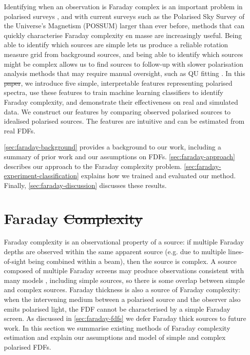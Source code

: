 \documentclass[11pt, a4paper]{book}
\providecommand{\DIFaddtex}[1]{{\protect\color{blue}\uwave{#1}}} %
\providecommand{\DIFdeltex}[1]{{\protect\color{red}\sout{#1}}}                      %
\providecommand{\DIFaddbegin}{} %
\providecommand{\DIFaddend}{} %
\providecommand{\DIFdelbegin}{} %
\providecommand{\DIFdelend}{} %
\providecommand{\DIFadd}[1]{\texorpdfstring{\DIFaddtex{#1}}{#1}} %
\providecommand{\DIFdel}[1]{\texorpdfstring{\DIFdeltex{#1}}{}} %
\newcommand{\DIFscaledelfig}{0.5}
\newlength{\DIFdelgraphicswidth} %
\newlength{\DIFdelgraphicsheight} %
\newcommand{\DIFaddincludegraphics}[2][]{{\color{blue}\fbox{\DIFOincludegraphics[#1]{#2}}}} %
\newcommand{\DIFdelincludegraphics}[2][]{%
\sbox{\DIFdelgraphicsbox}{\DIFOincludegraphics[#1]{#2}}%
\settoboxwidth{\DIFdelgraphicswidth}{\DIFdelgraphicsbox} %
\settoboxtotalheight{\DIFdelgraphicsheight}{\DIFdelgraphicsbox} %
\scalebox{\DIFscaledelfig}{%
\parbox[b]{\DIFdelgraphicswidth}{\usebox{\DIFdelgraphicsbox}\\[-\baselineskip] \rule{\DIFdelgraphicswidth}{0em}}\llap{\resizebox{\DIFdelgraphicswidth}{\DIFdelgraphicsheight}{%
\setlength{\unitlength}{\DIFdelgraphicswidth}%
\begin{picture}(1,1)%
\thicklines\linethickness{2pt} %
{\color[rgb]{1,0,0}\put(0,0){\framebox(1,1){}}}%
{\color[rgb]{1,0,0}\put(0,0){\line( 1,1){1}}}%
{\color[rgb]{1,0,0}\put(0,1){\line(1,-1){1}}}%
\end{picture}%
}\hspace*{3pt}}} %
} %
\DeclareRobustCommand{\DIFaddbegin}{\DIFOaddbegin \let\includegraphics\DIFaddincludegraphics} %
\DeclareRobustCommand{\DIFaddend}{\DIFOaddend \let\includegraphics\DIFOincludegraphics} %
\DeclareRobustCommand{\DIFdelbegin}{\DIFOdelbegin \let\includegraphics\DIFdelincludegraphics} %
\DeclareRobustCommand{\DIFdelend}{\DIFOaddend \let\includegraphics\DIFOincludegraphics} %
\begin{document}
  Identifying when an observation is Faraday complex is an important problem in polarised surveys \citep{sun15comparison}, and with current surveys such as the Polarised Sky Survey of the Universe's Magnetism (POSSUM) larger than ever before, methods that can quickly characterise Faraday complexity en masse are increasingly useful. Being able to identify which sources are simple lets us produce a reliable rotation measure grid from background sources, and being able to identify which sources might be complex allows us to find sources to follow-up with slower polarisation analysis methods that may require manual oversight, such as QU fitting \citep[as seen in e.g.][]{miyashita19qu,osullivan_broad-band_2017}. In this \DIFdelbegin \DIFdel{paper}\DIFdelend \DIFaddbegin \DIFadd{chapter}\DIFaddend , we introduce five simple, interpretable features representing polarised spectra, use these features to train machine learning classifiers to identify Faraday complexity, and demonstrate their effectiveness on real and simulated data. We construct our features by comparing observed polarised sources to idealised polarised sources. The features are intuitive and can be estimated from real FDFs.

  \autoref{sec:faraday-background} provides a background to our work, including a summary of prior work and our assumptions on FDFs. \autoref{sec:faraday-approach} describes our approach to the Faraday complexity problem. \autoref{sec:faraday-experiment-classification} explains how we trained and evaluated our method. Finally, \autoref{sec:faraday-discussion} discusses these results.

\section{Faraday \DIFdelbegin \DIFdel{Complexity}\DIFdelend \DIFaddbegin \DIFadd{complexity}\DIFaddend }
\label{sec:faraday-background}

    Faraday complexity is an observational property of a source: if multiple Faraday depths are observed within the same apparent source (e.g. due to multiple lines-of-sight being combined within a beam), then the source is complex. A source composed of multiple Faraday screens may produce observations consistent with many models \citep{sun15comparison}, including simple sources, so there is some overlap between simple and complex sources. Faraday thickness is also a source of Faraday complexity: when the intervening medium between a polarised source and the observer also emits polarised light, the FDF cannot be characterised by a simple Faraday screen. As discussed in \autoref{sec:faraday-fdfs} we defer Faraday thick sources to future work. In this section we summarise existing methods of Faraday complexity estimation and explain our assumptions and model of simple and complex polarised FDFs.
\end{document}
